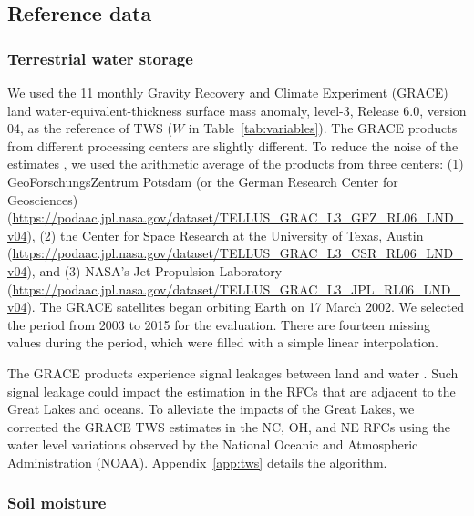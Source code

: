 \documentclass[essd, manuscript]{copernicus}
\begin{document}
\subsection{Reference data}\label{sec:methods:ref}

\subsubsection{Terrestrial water storage}\label{sec:methods:ref:tws}

We used the 1\degree{}\times{}1\degree{} monthly Gravity Recovery and Climate Experiment (GRACE) land water-equivalent-thickness surface mass anomaly, level-3, Release 6.0, version 04, as the reference of TWS (\(W\) in Table~\ref{tab:variables}). The GRACE products from different processing centers are slightly different. To reduce the noise of the estimates \citep{sakumura2014GRL}, we used the arithmetic average of the products from three centers: (1) GeoForschungsZentrum Potsdam (or the German Research Center for Geosciences) (\url{https://podaac.jpl.nasa.gov/dataset/TELLUS_GRAC_L3_GFZ_RL06_LND_v04}), (2) the Center for Space Research at the University of Texas, Austin (\url{https://podaac.jpl.nasa.gov/dataset/TELLUS_GRAC_L3_CSR_RL06_LND_v04}), and (3) NASA's Jet Propulsion Laboratory (\url{https://podaac.jpl.nasa.gov/dataset/TELLUS_GRAC_L3_JPL_RL06_LND_v04}). The GRACE satellites began orbiting Earth on 17 March 2002. We selected the period from 2003 to 2015 for the evaluation. There are fourteen missing values during the period, which were filled with a simple linear interpolation.

The GRACE products experience signal leakages between land and water \citep{save2016JGRSE}. Such signal leakage could impact the estimation in the RFCs that are adjacent to the Great Lakes \citep{ma2017JGRA} and oceans. To alleviate the impacts of the Great Lakes, we corrected the GRACE TWS estimates in the NC, OH, and NE RFCs using the water level variations observed by the National Oceanic and Atmospheric Administration (NOAA). Appendix~\ref{app:tws} details the algorithm.

\subsubsection{Soil moisture}\label{sec:methods:ref:sm}
\end{document}
